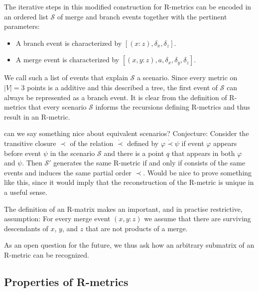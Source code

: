 \documentclass{article}
\newcommand{\TODO}[1]{\begingroup\color{red}#1\endgroup}
\begin{document}
The iterative steps in this modified construction for R-metrics can be
encoded in an ordered list $\mathcal{S}$ of merge and branch
events together with the pertinent parameters: \\
\begin{itemize} 
  \item[] A branch event is characterized by $[(x:z),\delta_x,\delta_z]$.
  \item[] A merge event is characterized by
    $[(x,y:z),a,\delta_x,\delta_y,\delta_z]$.
\end{itemize} 
We call such a list of events that explain $\mathcal{S}$ a scenario. 
Since every metric on $|V|=3$ points is a additive and this described a
tree, the first event of $\mathcal{S}$ can always be represented as a
branch event. It is clear from the definition of R-metrics that every
scenario $\mathcal{S}$ informs the recursions defining R-metrics and thus
result in an R-metric. 

\TODO{can we say something nice about equivalent scenarios? Conjecture:
  Consider the transitive closure $\prec$ of the relation $\dot\prec$
  defined by $\varphi\dot\prec\psi$ if event $\varphi$ appears before event
  $\psi$ in the scenario $\mathcal{S}$ and there is a point $q$ that
  appears in both $\varphi$ and $\psi$. Then $\mathcal{S}'$ generates the
  same R-metric if and only if consists of the same events and induces the
  same partial order $\prec$. Would be nice to prove something like this,
  since it would imply that the reconstruction of the R-metric is unique in
  a useful sense.} 

The definition of an R-matrix makes an important, and in practise
restrictive, assumption: For every merge event $(x,y:z)$ we assume that
there are surviving descendants of $x$, $y$, and $z$ that are not products
of a merge.

\TODO{As an open question for the future, we thus ask how an arbitrary 
submatrix of an R-metric can be recognized.} 

\subsection*{Properties of R-metrics} 
\end{document}
